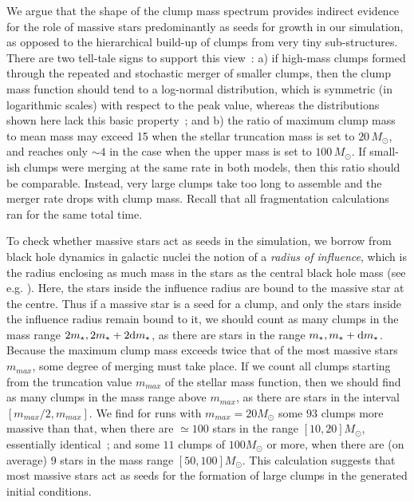 We argue that the shape of the clump mass spectrum provides indirect evidence for the role of massive stars predominantly as seeds for growth in our simulation, as opposed to the hierarchical build-up of  clumps from very tiny sub-structures. There are two tell-tale signs to support this view~: a) if high-mass clumps formed through the repeated and stochastic merger of smaller clumps, then the clump mass function should tend to a log-normal distribution, which is  symmetric (in logarithmic scales) with respect to the peak value, whereas the distributions shown here lack this basic property~; and b) the ratio of maximum clump mass to mean mass may exceed 15 when the  stellar truncation mass is set to $20\, M_\odot$, and reaches only $\sim 4$ in the case when the upper mass is set to $100\, M_\odot$. If small-ish clumps were merging at the same rate in both models, then this ratio should be comparable. Instead, very large clumps take too long to assemble and the merger rate drops with clump mass. Recall that all fragmentation calculations ran for the same total time. 

To check whether massive stars act as seeds in the simulation, we borrow from black hole dynamics in galactic nuclei the notion of a {\it radius of influence}, which is the radius  enclosing as much mass in the stars as the central black hole mass (see e.g. \citealt{Merritt2013}).  Here, the stars inside the influence radius are bound to the massive star at the centre. Thus if a massive star is a seed for a clump, and only the stars inside the influence radius remain bound to it, we should count as many clumps in the mass range $2m_\star, 2 m_\star + 2{\rm d}m_\star$, as there are stars in the range $m_\star, m_\star + {\rm d}m_\star$.  Because the maximum clump mass exceeds twice that of the most massive stars $m_{max}$, some degree of merging must take place. If we count all clumps starting from the truncation value $m_{max}$ of the stellar mass function,  
then we should find as many clumps in the mass range above $m_{max}$, as there are stars in the interval $[m_{max}/2, m_{max}]$.  We find for runs with $m_{max} = 20 M_\odot$ some $93$ clumps more massive than that, when there are $\simeq 100$ stars in the range $[10, 20] M_\odot$, essentially identical~; and some $11$ clumps of $100 M_\odot$ or more, when there are (on average) 9 stars in the mass range $[50, 100] M_\odot$. This calculation suggests that  most 
massive stars act as seeds for the formation of large clumps in the generated initial conditions.




